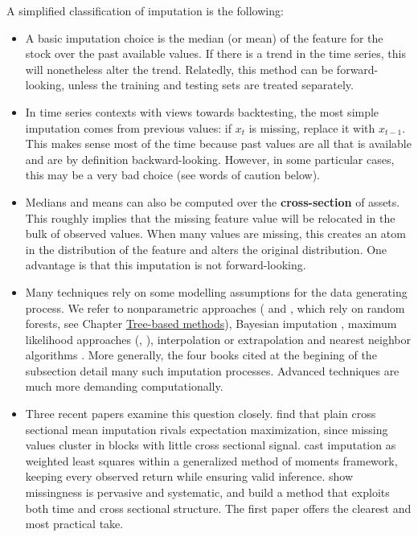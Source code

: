 A simplified classification of imputation is the following:

\begin{itemize}
\item A basic imputation choice is the median (or mean) of the feature for the stock over the past available values. If there is a trend in the time series, this will nonetheless alter the trend. Relatedly, this method can be forward-looking, unless the training and testing sets are treated separately.
\item In time series contexts with views towards backtesting, the most simple imputation comes from previous values: if $x_t$ is missing, replace it with $x_{t -1}$. This makes sense most of the time because past values are all that is available and are by definition backward-looking. However, in some particular cases, this may be a very bad choice (see words of caution below).
\item Medians and means can also be computed over the \textbf{cross-section} of assets. This roughly implies that the missing feature value will be relocated in the bulk of observed values. When many values are missing, this creates an atom in the distribution of the feature and alters the original distribution. One advantage is that this imputation is not forward-looking.
\item Many techniques rely on some modelling assumptions for the data generating process. We refer to nonparametric approaches (\cite{stekhoven2011missforest} and \cite{shah2014comparison}, which rely on random forests, see Chapter \href{/chap-07-trees}{Tree-based methods}), Bayesian imputation \citep{schafer1999multiple}, maximum likelihood approaches (\cite{enders2001primer}, \cite{enders2010applied}), interpolation or extrapolation and nearest neighbor algorithms \citep{garcia2009k}. More generally, the four books cited at the begining of the subsection detail many such imputation processes. Advanced techniques are much more demanding computationally.
\item Three recent papers examine this question closely. \cite{chen2024missing} find that plain cross sectional mean imputation rivals expectation maximization, since missing values cluster in blocks with little cross sectional signal. \cite{freyberger2025missing} cast imputation as weighted least squares within a generalized method of moments framework, keeping every observed return while ensuring valid inference. \cite{bryzgalova2025missing} show missingness is pervasive and systematic, and build a method that exploits both time and cross sectional structure. The first paper offers the clearest and most practical take.
\end{itemize}

